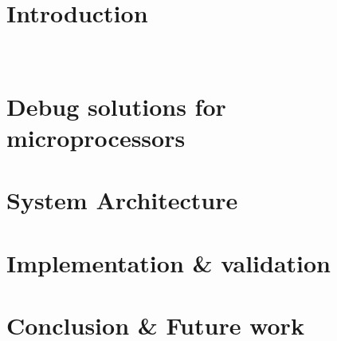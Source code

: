 \documentclass[a4paper,12pt,twoside]{report}
\author{Titto Thomas}
\begin{document}
	








\tableofcontents
\thispagestyle{titlepages}

\listoffigures
\thispagestyle{titlepages}

\pagebreak
{}
\chapter{Introduction}
\
\setcounter{page}{1}


\chapter{Debug solutions for microprocessors}


\chapter{System Architecture}


\chapter{Implementation \& validation}


\chapter{Conclusion \& Future work}






\printbibliography[heading=bibintoc]

\end{document}
